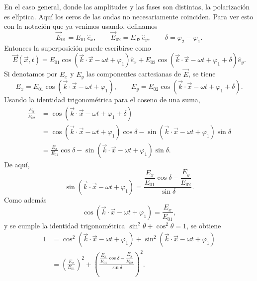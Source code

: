 \documentclass[../main.tex]{subfiles}
\begin{document}
En el caso general, donde las amplitudes y las fases son distintas, la polarización es elíptica. Aquí los ceros de las ondas no necesariamente coinciden. Para ver esto con la notación que ya venimos usando, definamos
\begin{equation*}
    \vec E_{01}=E_{01}\,\hat e_x,
    \qquad
    \vec E_{02}=E_{02}\,\hat e_y,
    \qquad
    \delta=\varphi_2-\varphi_1.
\end{equation*}
Entonces la superposición puede escribirse como
\begin{equation*}
    \vec E(\vec x,t)=E_{01}\cos\left(\vec k\cdot\vec x-\omega t+\varphi_1\right)\hat e_x+E_{02}\cos\left(\vec k\cdot\vec x-\omega t+\varphi_1+\delta\right)\hat e_y.
\end{equation*}
Si denotamos por $E_x$ y $E_y$ las componentes cartesianas de $\vec E$, se tiene
\begin{equation*}
    E_x=E_{01}\cos\left(\vec k\cdot\vec x-\omega t+\varphi_1\right),
    \qquad
    E_y=E_{02}\cos\left(\vec k\cdot\vec x-\omega t+\varphi_1+\delta\right).
\end{equation*}
Usando la identidad trigonométrica para el coseno de una suma,
\begin{align*}
    \frac{E_y}{E_{02}}
    &= \cos\left(\vec k\cdot\vec x-\omega t+\varphi_1+\delta\right) \\
    &= \cos\left(\vec k\cdot\vec x-\omega t+\varphi_1\right)\cos\delta
       -\sin\left(\vec k\cdot\vec x-\omega t+\varphi_1\right)\sin\delta \\
    &= \frac{E_x}{E_{01}}\cos\delta
       -\sin\left(\vec k\cdot\vec x-\omega t+\varphi_1\right)\sin\delta.
\end{align*}
De aquí,
\begin{equation*}
    \sin\left(\vec k\cdot\vec x-\omega t+\varphi_1\right)
    =\frac{\dfrac{E_x}{E_{01}}\cos\delta-\dfrac{E_y}{E_{02}}}{\sin\delta}.
\end{equation*}
Como además
\begin{equation*}
    \cos\left(\vec k\cdot\vec x-\omega t+\varphi_1\right)=\frac{E_x}{E_{01}},
\end{equation*}
y se cumple la identidad trigonométrica $\sin^2\theta+\cos^2\theta=1$, se obtiene
\begin{align*}
    1
    &= \cos^2\left(\vec k\cdot\vec x-\omega t+\varphi_1\right)
      +\sin^2\left(\vec k\cdot\vec x-\omega t+\varphi_1\right) \\
    &= \left(\frac{E_x}{E_{01}}\right)^2+
       \left(\frac{\dfrac{E_x}{E_{01}}\cos\delta-\dfrac{E_y}{E_{02}}}{\sin\delta}\right)^2.
\end{align*}
\end{document}
